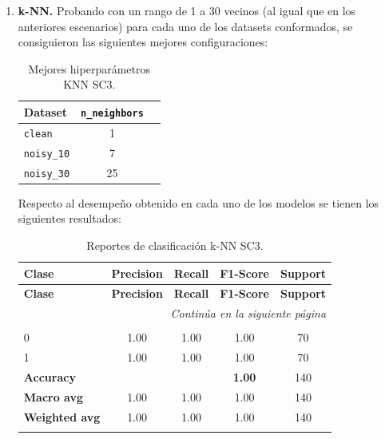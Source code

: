 \documentclass[12pt,a4paper]{article}
\begin{document}
\begin{enumerate}

  \item \textbf{k-NN.}
  Probando con un rango de 1 a 30 vecinos (al igual que en los anteriores escenarios) para cada uno de los datasets conformados, 
  se consiguieron las siguientes mejores configuraciones:

  \begin{table}[H]
    \centering
    \small
    \setlength{\tabcolsep}{4pt}
    \begin{tabularx}{\linewidth}{@{}l c c@{}}
      \toprule
      \textbf{Dataset} & \texttt{n\_neighbors}\\
      \midrule
      \texttt{clean}     & 1\\
      \texttt{noisy\_10} & 7\\
      \texttt{noisy\_30} & 25\\
      \bottomrule
    \end{tabularx}
    \caption{Mejores hiperparámetros KNN SC3.}
    \label{tab:best_hparams_knn_sc3}
  \end{table}
  
  Respecto al desempeño obtenido en cada uno de los modelos se tienen los siguientes resultados:

  \small
  \setlength{\tabcolsep}{4pt}
  \begin{longtable}{@{}lcccc@{}}
    \toprule
    \textbf{Clase} & \textbf{Precision} & \textbf{Recall} & \textbf{F1-Score} & \textbf{Support} \\
    \midrule
    \endfirsthead

    \toprule
    \textbf{Clase} & \textbf{Precision} & \textbf{Recall} & \textbf{F1-Score} & \textbf{Support} \\
    \midrule
    \endhead

    \midrule
    \multicolumn{5}{r}{\emph{Continúa en la siguiente página}} \\
    \endfoot

    \bottomrule
    \caption{Reportes de clasificación k-NN SC3.}
    \label{tab:reportes_clasificacion_knn_sc3}
    \endlastfoot

    \multicolumn{5}{@{}l}{\textbf{(a) clean}}\\
    0 & 1.00 & 1.00 & 1.00 & 70 \\
    1 & 1.00 & 1.00 & 1.00 & 70 \\
    \midrule
    \multicolumn{3}{l}{\textbf{Accuracy}}     & \textbf{1.00} & 140 \\
    \textbf{Macro avg}    & 1.00 & 1.00 & 1.00 & 140 \\
    \textbf{Weighted avg} & 1.00 & 1.00 & 1.00 & 140 \\
    \addlinespace[0.8em]


\end{longtable}
\end{enumerate}
\end{document}
